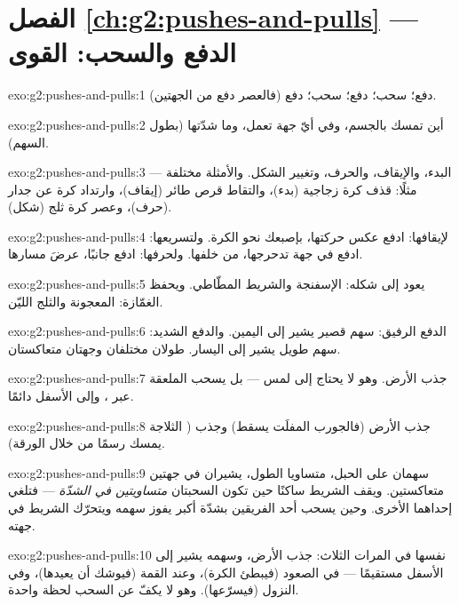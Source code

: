 \section*{الفصل \ref{ch:g2:pushes-and-pulls} --- الدفع والسحب: القوى}

\begin{solution}{exo:g2:pushes-and-pulls:1}
دفع؛ سحب؛ دفع؛ سحب؛ دفع (فالعصر دفع من الجهتين).
\end{solution}

\begin{solution}{exo:g2:pushes-and-pulls:2}
أين تمسك  بالجسم، وفي أيّ جهة تعمل، وما شدّتها (بطول
السهم).
\end{solution}

\begin{solution}{exo:g2:pushes-and-pulls:3}
البدء، والإيقاف، والحرف، وتغيير الشكل. والأمثلة مختلفة ---
مثلًا: قذف كرة زجاجية (بدء)، والتقاط قرص طائر (إيقاف)، وارتداد
كرة عن جدار (حرف)، وعصر كرة ثلج (شكل).
\end{solution}

\begin{solution}{exo:g2:pushes-and-pulls:4}
لإيقافها: ادفع عكس حركتها، بإصبعك نحو الكرة. ولتسريعها: ادفع في
جهة تدحرجها، من خلفها. ولحرفها: ادفع جانبًا، عرضَ مسارها.
\end{solution}

\begin{solution}{exo:g2:pushes-and-pulls:5}
يعود إلى شكله: الإسفنجة والشريط المطّاطي. ويحفظ الغمّازة:
المعجونة والثلج الليّن.
\end{solution}

\begin{solution}{exo:g2:pushes-and-pulls:6}
الدفع الرفيق: سهم قصير يشير إلى اليمين. والدفع الشديد: سهم طويل
يشير إلى اليسار. طولان مختلفان وجهتان متعاكستان.
\end{solution}

\begin{solution}{exo:g2:pushes-and-pulls:7}
جذب الأرض. وهو لا يحتاج إلى لمس --- بل يسحب الملعقة عبر ،
وإلى الأسفل دائمًا.
\end{solution}

\begin{solution}{exo:g2:pushes-and-pulls:8}
جذب الأرض (فالجورب المفلَت يسقط) وجذب  (
الثلاجة يمسك رسمًا من خلال الورقة).
\end{solution}

\begin{solution}{exo:g2:pushes-and-pulls:9}
سهمان على الحبل، متساويا الطول، يشيران في جهتين متعاكستين. ويقف
الشريط ساكنًا حين تكون السحبتان \emph{متساويتين في الشدّة} ---
فتلغي إحداهما الأخرى. وحين يسحب أحد الفريقين بشدّة أكبر يفوز
سهمه ويتحرّك الشريط في جهته.
\end{solution}

\begin{solution}{exo:g2:pushes-and-pulls:10}
 نفسها في المرات الثلاث: جذب الأرض، وسهمه يشير إلى الأسفل
مستقيمًا --- في الصعود (فيبطئ الكرة)، وعند القمة (فيوشك أن
يعيدها)، وفي النزول (فيسرّعها). وهو لا يكفّ عن السحب لحظة
واحدة.
\end{solution}
